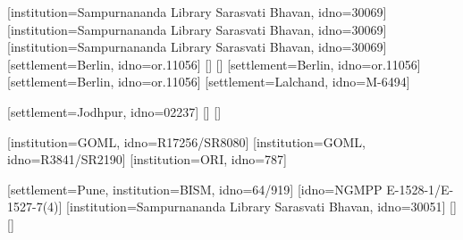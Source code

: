 
[institution=Sampurnananda Library Sarasvati Bhavan, idno=30069]
[institution=Sampurnananda Library Sarasvati Bhavan, idno=30069]
[institution=Sampurnananda Library Sarasvati Bhavan, idno=30069]
[settlement=Berlin, idno=or.11056]
        []
        []
[settlement=Berlin, idno=or.11056]
[settlement=Berlin, idno=or.11056]
[settlement=Lalchand, idno=M-6494]

[settlement=Jodhpur, idno=02237]
        []
        []


[institution=GOML, idno=R17256/SR8080]
[institution=GOML, idno=R3841/SR2190]
[institution=ORI, idno=787]

[settlement=Pune, institution=BISM, idno=64/919]
[idno=NGMPP E-1528-1/E-1527-7(4)]
[institution=Sampurnananda Library Sarasvati Bhavan, idno=30051]
        []
        []


